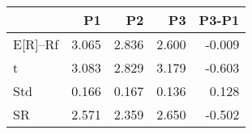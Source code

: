 \begin{tabular}{lrrrr}
\toprule
 & P1 & P2 & P3 & P3-P1 \\
\midrule
E[R]--Rf & 3.065 & 2.836 & 2.600 & -0.009 \\
t & 3.083 & 2.829 & 3.179 & -0.603 \\
Std & 0.166 & 0.167 & 0.136 & 0.128 \\
SR & 2.571 & 2.359 & 2.650 & -0.502 \\
\bottomrule
\end{tabular}
